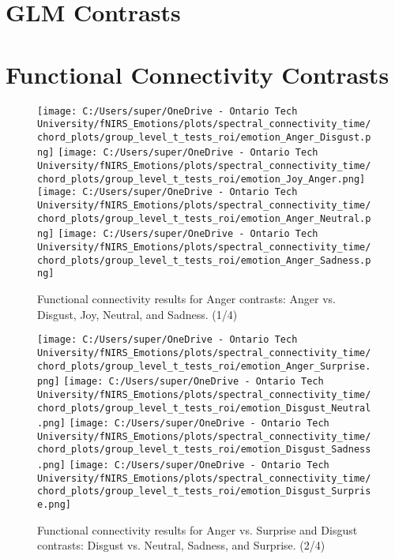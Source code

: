 \chapter{GLM Contrasts}
\label{tab:appendix_glm_results}


\chapter{Functional Connectivity Contrasts}
\begin{figure}[H]
    \centering
    \texttt{[image: C:/Users/super/OneDrive - Ontario Tech University/fNIRS\_Emotions/plots/spectral\_connectivity\_time/chord\_plots/group\_level\_t\_tests\_roi/emotion\_Anger\_Disgust.png]}
    \texttt{[image: C:/Users/super/OneDrive - Ontario Tech University/fNIRS\_Emotions/plots/spectral\_connectivity\_time/chord\_plots/group\_level\_t\_tests\_roi/emotion\_Joy\_Anger.png]}
    \texttt{[image: C:/Users/super/OneDrive - Ontario Tech University/fNIRS\_Emotions/plots/spectral\_connectivity\_time/chord\_plots/group\_level\_t\_tests\_roi/emotion\_Anger\_Neutral.png]}
    \texttt{[image: C:/Users/super/OneDrive - Ontario Tech University/fNIRS\_Emotions/plots/spectral\_connectivity\_time/chord\_plots/group\_level\_t\_tests\_roi/emotion\_Anger\_Sadness.png]}
    \caption[FC: Additional emotion contrasts]{Functional connectivity results for Anger contrasts: Anger vs. Disgust, Joy, Neutral, and Sadness. (1/4)}
    \label{fig:appendix_fc_emotion_analysis}
\end{figure}

\FloatBarrier

\begin{figure}[H]
    \ContinuedFloat
    \centering
    \texttt{[image: C:/Users/super/OneDrive - Ontario Tech University/fNIRS\_Emotions/plots/spectral\_connectivity\_time/chord\_plots/group\_level\_t\_tests\_roi/emotion\_Anger\_Surprise.png]}
    \texttt{[image: C:/Users/super/OneDrive - Ontario Tech University/fNIRS\_Emotions/plots/spectral\_connectivity\_time/chord\_plots/group\_level\_t\_tests\_roi/emotion\_Disgust\_Neutral.png]}
    \texttt{[image: C:/Users/super/OneDrive - Ontario Tech University/fNIRS\_Emotions/plots/spectral\_connectivity\_time/chord\_plots/group\_level\_t\_tests\_roi/emotion\_Disgust\_Sadness.png]}
    \texttt{[image: C:/Users/super/OneDrive - Ontario Tech University/fNIRS\_Emotions/plots/spectral\_connectivity\_time/chord\_plots/group\_level\_t\_tests\_roi/emotion\_Disgust\_Surprise.png]}
    \caption*{Functional connectivity results for Anger vs. Surprise and Disgust contrasts: Disgust vs. Neutral, Sadness, and Surprise. (2/4)}
\end{figure}

